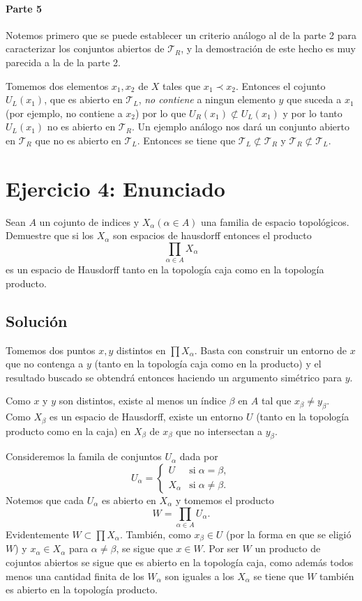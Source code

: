 \documentclass[fleqn,leqno,11pt,letterpaper,final]{article}
\begin{document}
\paragraph{Parte 5}%

Notemos primero que se puede establecer un criterio análogo al de la parte 2
para caracterizar los conjuntos abiertos de $\mathcal{T}_R$, y la demostración de este hecho
es muy parecida a la de la parte 2.

Tomemos dos elementos $x_1,x_2$ de $X$ tales que $x_1\prec x_2$. Entonces el cojunto $U_L(x_1)$, que
es abierto en $\mathcal{T}_L$, \emph{no contiene} a ningun elemento $y$ que suceda a $x_1$ (por ejemplo,
no contiene a $x_2$) por lo que $U_R(x_1)\not\subset U_L(x_1)$ y por lo tanto $U_L(x_1)$ no es abierto
en $\mathcal{T}_R$. Un ejemplo análogo nos dará un conjunto abierto en $\mathcal{T}_R$ que no es abierto
en $\mathcal{T}_L$. Entonces se tiene que $\mathcal{T}_L\not\subset\mathcal{T}_R$ y $\mathcal{T}_R\not\subset\mathcal{T}_L$.

\section{Ejercicio 4: Enunciado}
\hspace{-.6em}\footnotemark 
Sean $A$ un cojunto de indices y $X_{\alpha} (\alpha\in A)$ una familia de espacio topológicos.
Demuestre que si los $X_{\alpha}$ son espacios de hausdorff
entonces el producto
\[
\prod_{\alpha\in A} X_{\alpha}
\]
es un espacio de Hausdorff tanto en la topología caja como en la topología producto.

\subsection{Solución}
Tomemos dos puntos $x,y$ distintos en $\prod X_{\alpha}$. Basta con construir
un entorno de $x$ que no contenga a $y$ (tanto en la topología caja como en la producto)
y el resultado buscado se obtendrá entonces haciendo un argumento simétrico para $y$.

Como $x$ y $y$ son distintos,
existe al menos un índice $\beta$ en $A$ tal que $x_{\beta}\neq y_{\beta}$.
Como $X_{\beta}$ es un espacio de Hausdorff, existe  un entorno $U$
(tanto en la topología producto como en la caja)
en $X_{\beta}$ de $x_{\beta}$ que no intersectan a $y_{\beta}$.

Consideremos la famila de conjuntos $U_\alpha$ dada por
\[
U_{\alpha}=
\begin{cases}
U &\text{si}\;\alpha=\beta,\\
X_\alpha &\text{si}\;\alpha\neq \beta.
\end{cases}
\]
Notemos que cada $U_\alpha$ es abierto en $X_\alpha$ y tomemos el producto
\[
W=\prod_{\alpha\in A} U_\alpha.
\]
Evidentemente $W\subset\prod X_{\alpha}$. También, como $x_{\beta}\in U$ 
(por la forma en que se eligió $W$) y $x_\alpha\in X_{\alpha}$ para
$\alpha\neq\beta$, se sigue que $x\in W$. Por ser $W$ un producto
de cojuntos abiertos se sigue que es abierto en la topología
caja, como además todos menos una cantidad finita de los 
$W_\alpha$ son iguales a los $X_\alpha$ se tiene que $W$ también
es abierto en la topología producto.
\end{document}
